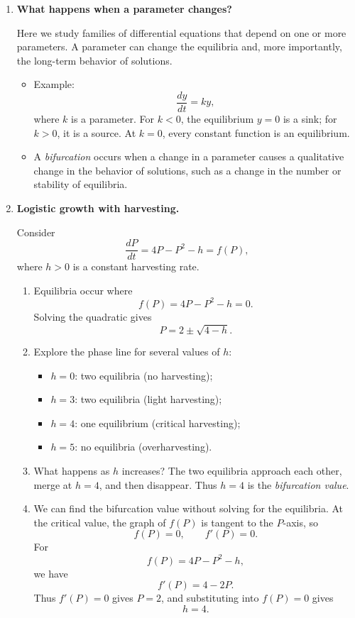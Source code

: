 \documentclass{article}
\begin{document}
\begin{enumerate}


\item \textbf{What happens when a parameter changes?}

Here we study families of differential equations that depend on one or more
parameters. A parameter can change the equilibria and, more importantly, the
long-term behavior of solutions.

\begin{itemize}
\item Example:
\[
\frac{dy}{dt}=ky,
\]
where $k$ is a parameter. For $k<0$, the equilibrium $y=0$ is a sink; for
$k>0$, it is a source. At $k=0$, every constant function is an equilibrium.

\item A \emph{bifurcation} occurs when a change in a parameter causes a
qualitative change in the behavior of solutions, such as a change in the
number or stability of equilibria.
\end{itemize}
\item \textbf{Logistic growth with harvesting.}

Consider
\[
\frac{dP}{dt}=4P-P^2-h=f(P),
\]
where $h>0$ is a constant harvesting rate.

\begin{enumerate}
\item Equilibria occur where
\[
f(P)=4P-P^2-h=0.
\]
Solving the quadratic gives
\[
P=2\pm\sqrt{4-h}.
\]

\item Explore the phase line for several values of $h$:
\begin{itemize}
\item $h=0$: two equilibria (no harvesting);
\item $h=3$: two equilibria (light harvesting);
\item $h=4$: one equilibrium (critical harvesting);
\item $h=5$: no equilibria (overharvesting).
\end{itemize}

\item What happens as $h$ increases? The two equilibria approach each other,
merge at $h=4$, and then disappear. Thus $h=4$ is the \emph{bifurcation value}.

\item We can find the bifurcation value without solving for the equilibria.
At the critical value, the graph of $f(P)$ is tangent to the $P$-axis, so
\[
f(P)=0,\qquad f'(P)=0.
\]
For
\[
f(P)=4P-P^2-h,
\]
we have
\[
f'(P)=4-2P.
\]
Thus $f'(P)=0$ gives $P=2$, and substituting into $f(P)=0$ gives
\[
h=4.
\]


\end{enumerate}
\end{enumerate}
\end{document}
